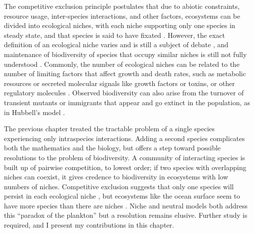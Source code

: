 The competitive exclusion principle postulates that due to abiotic constraints, resource usage, inter-species interactions, and other factors, ecosystems can be divided into ecological niches, with each niche supporting only one species in steady state, and that species is said to have fixated \cite{Hardin1960,Mayfield2010,Kimura1968,Nadell2013}. 
However, the exact definition of an ecological niche varies and is still a subject of debate \cite{Leibold1995,Hutchinson1961,Abrams1980,Chesson2000,Adler2010,Capitan2017,Fisher2014}, and maintenance of biodiversity of species that occupy similar niches is still not fully understood \cite{May1999,Pennisi2005,Posfai2017}. 
Commonly, the number of ecological niches can be related to the number of limiting factors that affect growth and death rates, such as metabolic resources or secreted molecular signals like growth factors or toxins, or other regulatory molecules \cite{Armstrong1976,McGehee1977a,Armstrong1980,Posfai2017}. 
Observed biodiversity can also arise from the turnover of transient mutants or immigrants that appear and go extinct in the population, as in Hubbell's model \cite{Hubbell2001,Desai2007,Carroll2015}.
\fi

The previous chapter treated the tractable problem of a single species experiencing only intraspecies interactions. 
Adding a second species complicates both the mathematics and the biology, but offers a step toward possible resolutions to the problem of biodiversity. 
A community of interacting species is built up of pairwise competition, to lowest order; if two species with overlapping niches can coexist, it gives credence to biodiversity in ecosystems with low numbers of niches. 
Competitive exclusion suggests that only one species will persist in each ecological niche \cite{Gause1934,Hardin1960,Palmer1994}, but ecosystems like the ocean surface seem to have more species than there are niches \cite{Hutchinson1961}. %
Niche and neutral models both address this ``paradox of the plankton'' but a resolution remains elusive. 
Further study is required, and I present my contributions in this chapter. 

